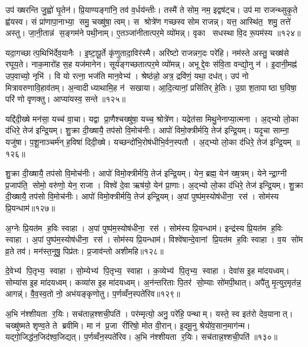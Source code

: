 उप॑ ख्षरन्ति जु॒ह्वो॑ घृ॒तेन॑। प्रि॒याण्यङ्गा॑नि॒ तव॑ व॒र्धय॑न्तीः। तस्मै॑ ते सोम॒ नम॒ इद्वष॑ट्च। उप॑ मा राजन्थ्सुकृ॒ते ह्व॑यस्व। सं प्रा॑णापा॒नाभ्या॒ समु॒ चख्षु॑षा॒ त्वम्। स श्रोत्रे॑ण गच्छस्व सोम राजन्न्। यत्त॒ आस्थि॑त॒ शमु॒ तत्ते॑ अस्तु। जा॒नी॒तान्न॑ स॒ङ्गम॑ने पथी॒नाम्। ए॒तञ्जा॑नीतात्पर॒मे व्यो॑मन्न्। वृका सधस्था वि॒द रू॒पम॑स्य ॥१२४॥

यदा॒गच्छात्प॒थिभि॑र्देव॒यानैः। इ॒ष्टा॒पू॒र्ते कृ॑णुतादा॒विर॑स्मै। अरि॑ष्टो राजन्नग॒दः परे॑हि। नम॑स्ते अस्तु॒ चख्ष॑से रघूय॒ते। नाक॒मारो॑ह स॒ह यज॑मानेन। सूर्य॑ङ्गच्छतात्पर॒मे व्यो॑मन्न्। अभूद्दे॒वः स॑वि॒ता वन्द्यो॒नु न॑। इ॒दानी॒मह्न॑ उप॒वाच्यो॒ नृभि॑। वि यो रत्ना॒ भज॑ति मान॒वेभ्य॑। श्रेष्ठ॑न्नो॒ अत्र॒ द्रवि॑णं॒ यथा॒ दध॑त्। उप॑ नो मित्रावरुणावि॒हाव॑तम्। अ॒न्वादीध्याथामि॒ह न॑ सखाया। आ॒दि॒त्यानां॒ प्रसि॑तिर् हे॒तिः। उ॒ग्रा श॒तापाष्ठा घ॒विषा॒ परि॑ णो वृणक्तु। आप्या॑यस्व॒ सन्ते॥१२५॥\anuvakamend[त्मना॒ जाय॑मानोऽस्य॒ दध॒त्पञ्च॑ च]

यद्दि॑दी॒ख्षे मन॑सा॒ यच्च॑ वा॒चा। यद्वा प्रा॒णैश्चख्षु॑षा॒ यच्च॒ श्रोत्रे॑ण। यद्रेत॑सा मिथु॒नेनाप्या॒त्मना। अ॒द्भ्यो लो॒का द॑धिरे॒ तेज॑ इन्द्रि॒यम्। शु॒क्रा दी॒ख्षायै॒ तप॑सो वि॒मोच॑नीः। आपो॑ विमो॒क्त्रीर्मयि॒ तेज॑ इन्द्रि॒यम्। यदृ॒चा साम्ना॒ यजु॑षा। प॒शू॒नाञ्चर्म॑न् ह॒विषा॑ दिदी॒ख्षे। यच्छन्दो॑भि॒रोष॑धीभि॒र्वन॒स्पतौ। अ॒द्भ्यो लो॒का द॑धिरे॒ तेज॑ इन्द्रि॒यम् ॥१२६॥

शु॒क्रा दी॒ख्षायै॒ तप॑सो वि॒मोच॑नीः। आपो॑ विमो॒क्त्रीर्मयि॒ तेज॑ इन्द्रि॒यम्। येन॒ ब्रह्म॒ येन॑ ख्ष॒त्रम्। येनेन्द्रा॒ग्नी प्र॒जाप॑ति॒ सोमो॒ वरु॑णो॒ येन॒ राजा। विश्वे॑ दे॒वा ऋष॑यो॒ येन॑ प्रा॒णाः। अ॒द्भ्यो लो॒का द॑धिरे॒ तेज॑ इन्द्रि॒यम्। शु॒क्रा दी॒ख्षायै॒ तप॑सो वि॒मोच॑नीः। आपो॑ विमो॒क्त्रीर्मयि॒ तेज॑ इन्द्रि॒यम्। अ॒पां पुष्प॑म॒स्योष॑धीना॒ रस॑। सोम॑स्य प्रि॒यन्धाम॑॥१२७॥

अ॒ग्नेः प्रि॒यत॑म ह॒विः स्वाहा। अ॒पां पुष्प॑म॒स्योष॑धीना॒ रस॑। सोम॑स्य प्रि॒यन्धाम॑। इन्द्र॑स्य प्रि॒यत॑म ह॒विः स्वाहा। अ॒पां पुष्प॑म॒स्योष॑धीना॒ रस॑। सोम॑स्य प्रि॒यन्धाम॑। विश्वे॑षान्दे॒वानां प्रि॒यत॑म ह॒विः स्वाहा। व॒य सो॑म व्र॒ते तव॑। मन॑स्त॒नूषु॒ पिप्र॑तः। प्र॒जाव॑न्तो अशीमहि॥१२८॥

दे॒वेभ्य॑ पि॒तृभ्य॒ स्वाहा। सो॒म्येभ्य॑ पि॒तृभ्य॒ स्वाहा। क॒व्येभ्य॑ पि॒तृभ्य॒ स्वाहा। देवा॑स इ॒ह मा॑दयध्वम्। सोम्या॑स इ॒ह मा॑दयध्वम्। कव्या॑स इ॒ह मा॑दयध्वम्। अ॒न॑न्तरिताः पि॒तर॑ सो॒म्याः सो॑मपी॒थात्। अपै॑तु मृ॒त्युर॒मृत॑न्न॒ आगन्न्॑। वै॒व॒स्व॒तो नो॒ अभ॑यङ्कृणोतु। प॒र्णव्वँन॒स्पते॑रिव॥१२९॥

अ॒भि न॑श्शीयता र॒यिः। सच॑तान्न॒श्शची॒पति॑। पर॑म्मृत्यो॒ अनु॒ परे॑हि॒ पन्थाम्। यस्ते॒ स्व इत॑रो देव॒यानात्। चख्षु॑ष्मते शृण्व॒ते ते ब्रवीमि। मा न॑ प्र॒जा री॑रिषो॒ मोत वी॒रान्। इ॒दमू॒नु श्रेयो॑व॒सान॒माग॑न्म। यद्गो॒जिद्ध॑न॒जिद॑श्व॒जिद्यत्। प॒र्णव्वँन॒स्पते॑रिव। अ॒भि न॑श्शीयता र॒यिः। सच॑तान्न॒श्शची॒पति॑॥१३०॥

